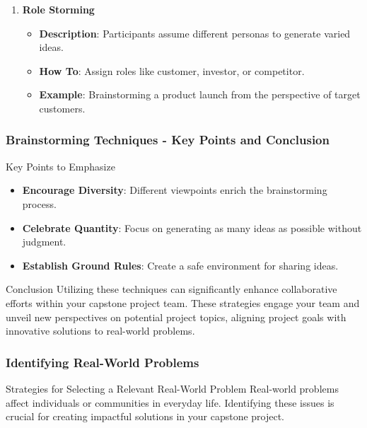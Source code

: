 \documentclass{beamer}
\begin{document}
\begin{frame}[fragile]
\begin{enumerate}
        \item \textbf{Role Storming}
        \begin{itemize}
            \item \textbf{Description}: Participants assume different personas to generate varied ideas.
            \item \textbf{How To}: Assign roles like customer, investor, or competitor.
            \item \textbf{Example}: Brainstorming a product launch from the perspective of target customers.
        \end{itemize}
    \end{enumerate}
\end{frame}

\begin{frame}[fragile]
    \frametitle{Brainstorming Techniques - Key Points and Conclusion}
    \begin{block}{Key Points to Emphasize}
        \begin{itemize}
            \item \textbf{Encourage Diversity}: Different viewpoints enrich the brainstorming process.
            \item \textbf{Celebrate Quantity}: Focus on generating as many ideas as possible without judgment.
            \item \textbf{Establish Ground Rules}: Create a safe environment for sharing ideas.
        \end{itemize}
    \end{block}

    \begin{block}{Conclusion}
        Utilizing these techniques can significantly enhance collaborative efforts within your capstone project team. These strategies engage your team and unveil new perspectives on potential project topics, aligning project goals with innovative solutions to real-world problems.
    \end{block}
\end{frame}

\begin{frame}[fragile]
    \frametitle{Identifying Real-World Problems}
    \begin{block}{Strategies for Selecting a Relevant Real-World Problem}
        Real-world problems affect individuals or communities in everyday life. Identifying these issues is crucial for creating impactful solutions in your capstone project.
    \end{block}
\end{frame}
\end{document}
